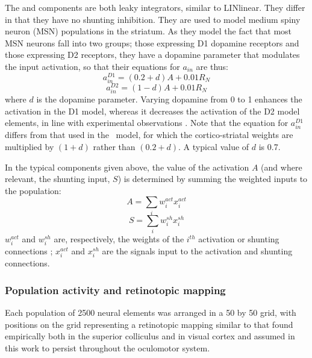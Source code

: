 \documentclass{frontiersSCNS}
\begin{document}
The  and  components are both leaky integrators, similar to
LINlinear. They differ in that they have no shunting inhibition. They
are used to model medium spiny neuron (MSN) populations in the
striatum. As they model the fact that most MSN neurons fall into two
groups; those expressing D1 dopamine receptors and those expressing D2
receptors, they have a dopamine parameter that modulates the input
activation, so that their equations for $a_{in}$ are thus:
\begin{equation} \label{eq:a_in_d1}
   a_{in}^{D1} = (0.2 + d)A + 0.01 R_N
\end{equation}
\begin{equation} \label{eq:a_in_d2}
   a_{in}^{D2} = (1 - d)A + 0.01 R_N
\end{equation}
where $d$ is the dopamine parameter. Varying dopamine from 0 to 1
enhances the activation in the D1 model, whereas it decreases the
activation of the D2 model elements, in line with experimental
observations \citep{harsing_influence_1997,gonon_prolonged_1997}.
Note that the equation for $a_{in}^{D1}$ differs from that used in
the \ccg~model, for which the cortico-striatal weights are multiplied
by $(1+d)$ rather than $(0.2+d)$. A typical value of $d$ is 0.7.

In the typical components given above, the value of the activation $A$
(and where relevant, the shunting input, $S$) is determined by summing
the weighted inputs to the population:
\begin{equation}
A = \sum_{i}w_i^{act} x_i^{act}
\end{equation}
\begin{equation}
S = \sum_{i}w_i^{sh} x_i^{sh}
\end{equation}
$w_i^{act}$ and $w_i^{sh}$ are, respectively, the weights of the
$i^{th}$ activation or shunting connections ;
$x_i^{act}$ and $x_i^{sh}$ are the signals input to the activation and
shunting connections.

\subsubsection{Population activity and retinotopic mapping}
\label{sec:mapping}

Each population of 2500 neural elements was arranged in a 50 by 50
grid, with positions on the grid representing a retinotopic mapping
similar to that found empirically both in the superior
colliculus \citep{ottes_visuomotor_1986} and in visual cortex
\citep{eric_l._schwartz_computational_1980}
and assumed in this work to persist throughout the oculomotor system.
\end{document}
